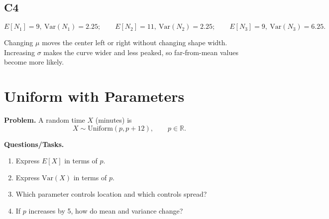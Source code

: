 \subsection*{C4}
\[
E[N_1]=9,\ \mathrm{Var}(N_1)=2.25;
\qquad
E[N_2]=11,\ \mathrm{Var}(N_2)=2.25;
\qquad
E[N_3]=9,\ \mathrm{Var}(N_3)=6.25.
\]
\begin{center}
\end{center}
Changing \(\mu\) moves the center left or right without changing shape width. Increasing \(\sigma\) makes the curve wider and less peaked, so far-from-mean values become more likely.

\section{Uniform with Parameters}

\textbf{Problem.}
A random time \(X\) (minutes) is
\[
X\sim \text{Uniform}(p,p+12),\qquad p\in\mathbb{R}.
\]

\textbf{Questions/Tasks.}
\begin{enumerate}[label=\textbf{\alph*)}]
  \item Express \(E[X]\) in terms of \(p\).
  \item Express \(\mathrm{Var}(X)\) in terms of \(p\).
  \item Which parameter controls location and which controls spread?
  \item If \(p\) increases by 5, how do mean and variance change?
\end{enumerate}

